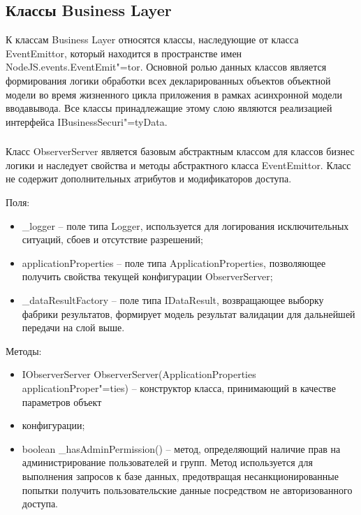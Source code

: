 \subsection{Классы Business Layer}
\label{sub:arch_and_mod:probab_net}

К классам Business Layer относятся классы, наследующие от класса EventEmittor, который находится в пространстве имен NodeJS.events.EventEmit"=tor. Основной ролью данных классов является формирования логики обработки всех декларированных объектов объектной модели во время жизненного цикла приложения в рамках асинхронной модели ввода\/вывода. Все классы принадлежащие этому слою являются реализацией интерфейса IBusinessSecuri"=tyData.

\subsubsection{}
\label{sub:arch_and_mod:probab_net:observer}

Класс ObserverServer является базовым абстрактным классом для классов бизнес логики и наследует свойства и методы абстрактного класса EventEmittor. Класс не содержит дополнительных атрибутов и модификаторов доступа.

Поля:
\begin{itemize}
  \item \_logger – поле типа Logger, используется для логирования исключительных ситуаций, сбоев и отсутствие разрешений;
  \item applicationProperties – поле типа ApplicationProperties, позволяющее получить свойства текущей конфигурации ObserverServer;
  \item \_dataResultFactory – поле типа IDataResult, возвращающее выборку фабрики результатов, формирует модель результат валидации для дальнейшей передачи на слой выше.
\end{itemize}

Методы:
\begin{itemize}
  \item IObserverServer ObserverServer(ApplicationProperties applicationProper"=ties) – конструктор класса, принимающий в качестве параметров объект
  \item конфигурации;
  \item boolean \_hasAdminPermission() – метод, определяющий наличие прав на администрирование пользователей и групп. Метод используется для выполнения запросов к базе данных, предотвращая несанкционированные попытки получить пользовательские данные посредством не авторизованного доступа.
\end{itemize}

